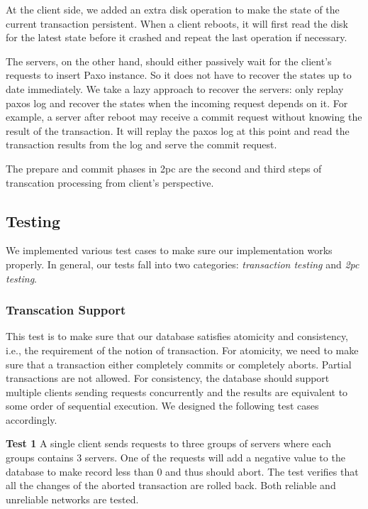 \documentclass{vldb}
\begin{document}
At the client side, we added an extra disk operation to make the state of the current
transaction persistent. When a client reboots, it will first read the disk for the
latest state before it crashed and repeat the last operation if necessary. 

The servers, on the other hand, should either passively wait for the client’s
requests to insert Paxo instance. So it does not have to recover the states up to
date immediately. We take a lazy approach to recover the servers: only replay paxos
log and recover the states when the incoming request depends on it. For example, a
server after reboot may receive a commit request without knowing the result of the
transaction. It will replay the paxos log at this point and read the transaction
results from the log and serve the commit request.

The prepare and commit phases in 2pc are the second and third steps of transcation
processing from client's perspective.



\subsection{Testing}

We implemented various test cases to make sure our implementation 
works properly. In general, our tests fall into two categories: 
\textit{transaction testing} and \textit{2pc testing}. 

\subsubsection{Transcation Support}

This test is to make sure that our database satisfies atomicity and 
consistency, i.e., the requirement of the notion of transaction. For 
atomicity, we need to make sure that a transaction either completely 
commits or completely aborts. Partial transactions are not allowed.  
For consistency, the database should support multiple clients sending 
requests concurrently and the results are equivalent to some order of 
sequential execution. We designed the following test cases 
accordingly.

\textbf{Test 1} A single client sends requests to three groups of 
servers where each groups contains 3 servers. One of the requests
will add a negative value to the database to make record less than 0 
and thus should abort. The test verifies that all the changes of the 
aborted transaction are rolled back. Both reliable and unreliable 
networks are tested.
\end{document}
